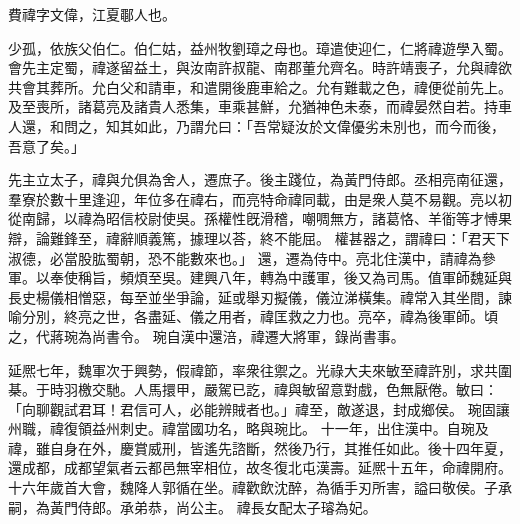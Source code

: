 \begin{pinyinscope}
 
 
 費禕字文偉，江夏鄳人也。
 
 
 少孤，依族父伯仁。伯仁姑，益州牧劉璋之母也。璋遣使迎仁，仁將禕遊學入蜀。會先主定蜀，禕遂留益土，與汝南許叔龍、南郡董允齊名。時許靖喪子，允與禕欲共會其葬所。允白父和請車，和遣開後鹿車給之。允有難載之色，禕便從前先上。及至喪所，諸葛亮及諸貴人悉集，車乘甚鮮，允猶神色未泰，而禕晏然自若。持車人還，和問之，知其如此，乃謂允曰：「吾常疑汝於文偉優劣未別也，而今而後，吾意了矣。」
 
 
先主立太子，禕與允俱為舍人，遷庶子。後主踐位，為黃門侍郎。丞相亮南征還，羣寮於數十里逢迎，年位多在禕右，而亮特命禕同載，由是衆人莫不易觀。亮以初從南歸，以禕為昭信校尉使吳。孫權性旣滑稽，嘲啁無方，諸葛恪、羊衜等才愽果辯，論難鋒至，禕辭順義篤，據理以荅，終不能屈。
 權甚器之，謂禕曰：「君天下淑德，必當股肱蜀朝，恐不能數來也。」
 還，遷為侍中。亮北住漢中，請禕為參軍。以奉使稱旨，頻煩至吳。建興八年，轉為中護軍，後又為司馬。值軍師魏延與長史楊儀相憎惡，每至並坐爭論，延或舉刃擬儀，儀泣涕橫集。禕常入其坐間，諫喻分別，終亮之世，各盡延、儀之用者，禕匡救之力也。亮卒，禕為後軍師。頃之，代蔣琬為尚書令。
 琬自漢中還涪，禕遷大將軍，錄尚書事。
 
 
延熈七年，魏軍次于興勢，假禕節，率衆往禦之。光祿大夫來敏至禕許別，求共圍棊。于時羽檄交馳。人馬擐甲，嚴駕已訖，禕與敏留意對戲，色無厭倦。敏曰：「向聊觀試君耳！君信可人，必能辨賊者也。」禕至，敵遂退，封成鄉侯。
 琬固讓州職，禕復領益州刺史。禕當國功名，略與琬比。
 十一年，出住漢中。自琬及禕，雖自身在外，慶賞威刑，皆遙先諮斷，然後乃行，其推任如此。後十四年夏，還成都，成都望氣者云都邑無宰相位，故冬復北屯漢壽。延熈十五年，命禕開府。十六年歲首大會，魏降人郭循在坐。禕歡飲沈醉，為循手刃所害，謚曰敬侯。子承嗣，為黃門侍郎。承弟恭，尚公主。
 禕長女配太子璿為妃。
 
 
\end{pinyinscope}